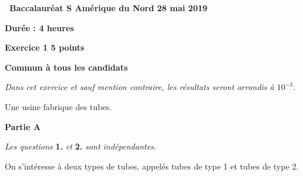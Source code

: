 \documentclass[10pt]{article}
\begin{document}
\setlength\parindent{0mm}
\pagestyle{fancy}
\thispagestyle{empty}
\begin{center}
    
{\Large \textbf{\decofourleft~Baccalauréat S Amérique du Nord 28 mai 2019~\decofourright}}
    
\bigskip
    
\textbf{Durée : 4 heures} \end{center}

\bigskip

\textbf{Exercice 1 \hfill 5 points} 

\textbf{Commun à tous les candidats} 

\medskip

\emph{Dans cet exercice et sauf mention contraire, les résultats seront arrondis à }$10^{-3}$.

\bigskip

Une usine fabrique des tubes.

\bigskip

\textbf{Partie A}

\bigskip

\emph{Les questions} \textbf{1.} \emph{et} \textbf{2.} \emph{sont indépendantes.}

\medskip

On s'intéresse à deux types de tubes, appelés tubes de type 1 et tubes de type 2.

\medskip
\end{document}
